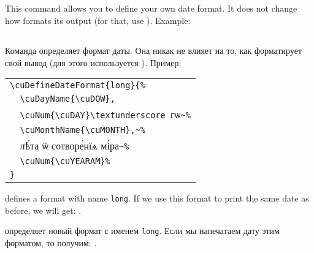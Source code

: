 \begin{EN}
\subsection{}
This command allows you to define your own date format.
It does not change how  formats its output (for that, use ).
Example:
\end{EN}

\begin{RU}
\subsection{}
Команда определяет формат даты. Она никак не влияет на то, как  форматирует свой вывод (для этого используется ).
Пример:
\end{RU}

\begin{center}
\begin{churchslavonic}
\begin{tabular}{l}
\verb+\cuDefineDateFormat{long}{%+\\
\verb+  \cuDayName{\cuDOW},+\\
\verb+  \cuNum{\cuDAY}\textunderscore +гѡ\verb+~%+\\
\verb+  \cuMonthName{\cuMONTH},~%+\\
\verb+  +лѣ́та ѿ сотворе́нїѧ мі́ра\verb+~%+\\
\verb+  \cuNum{\cuYEARAM}%+\\
\verb+}+\\
\end{tabular}
\end{churchslavonic}
\end{center}
%
\begin{EN}
defines a format with name \texttt{long}. If we use this format to print the same date as before, we will get:
.
\end{EN}
%
\begin{RU}
определяет новый формат с именем \texttt{long}. Если мы напечатаем дату этим форматом, то получим:
.
\end{RU}

